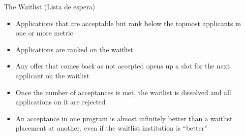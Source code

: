 \begin{frame}[fragile]{The Waitlist \textcolor{yellow!80!black}{(Lista de espera)}}
\begin{itemize}
    \item Applications that are acceptable but rank below the topmost applicants in one or more metric
    \item Applications are ranked on the waitlist
    \item Any offer that comes back as not accepted opens up a slot for the next applicant on the waitlist
    \item Once the number of acceptances is met, the waitlist is dissolved and all applications on it are rejected
    \item An acceptance in one program is almost infinitely better than a waitlist placement at another, even if the waitlist institution is ``better''
\end{itemize}
\end{frame}

